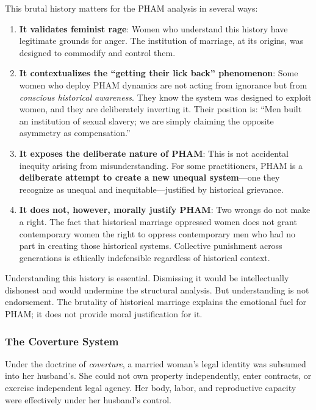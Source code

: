 \documentclass[12pt, letterpaper]{article}
\begin{document}
This brutal history matters for the PHAM analysis in several ways:

\begin{enumerate}
    \item \textbf{It validates feminist rage}: Women who understand this history have legitimate grounds for anger. The institution of marriage, at its origins, was designed to commodify and control them.
    
    \item \textbf{It contextualizes the ``getting their lick back'' phenomenon}: Some women who deploy PHAM dynamics are not acting from ignorance but from \textit{conscious historical awareness}. They know the system was designed to exploit women, and they are deliberately inverting it. Their position is: ``Men built an institution of sexual slavery; we are simply claiming the opposite asymmetry as compensation.''
    
    \item \textbf{It exposes the deliberate nature of PHAM}: This is not accidental inequity arising from misunderstanding. For some practitioners, PHAM is a \textbf{deliberate attempt to create a new unequal system}---one they recognize as unequal and inequitable---justified by historical grievance.
    
    \item \textbf{It does not, however, morally justify PHAM}: Two wrongs do not make a right. The fact that historical marriage oppressed women does not grant contemporary women the right to oppress contemporary men who had no part in creating those historical systems. Collective punishment across generations is ethically indefensible regardless of historical context.
\end{enumerate}

Understanding this history is essential. Dismissing it would be intellectually dishonest and would undermine the structural analysis. But understanding is not endorsement. The brutality of historical marriage explains the emotional fuel for PHAM; it does not provide moral justification for it.

\subsubsection{The Coverture System}

Under the doctrine of \textit{coverture}, a married woman's legal identity was subsumed into her husband's. She could not own property independently, enter contracts, or exercise independent legal agency. Her body, labor, and reproductive capacity were effectively under her husband's control.
\end{document}
